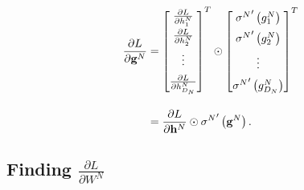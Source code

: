 \documentclass{article}
\newcommand{\pd}[0]{\phantom{.}}
\begin{document}
\begin{align}
    \label{eq:dL/dgN}
    \pd\frac{\partial L}{\partial \mathbf{g}^N} &=
    \begin{bmatrix}
        \frac{\partial L}{\partial h^N_1} \\[0.5em]
        \frac{\partial L}{\partial h^N_2} \\[0.5em]
        \vdots \\[0.5em]
        \frac{\partial L}{\partial h^N_{D_N}}
    \end{bmatrix}^T
    \odot
    \begin{bmatrix}
        {\sigma^{N}}^{\prime}\left(g^N_1\right) \\[0.5em]
        {\sigma^{N}}^{\prime}\left(g^N_2\right) \\[0.5em]
        \vdots \\[0.5em]
        {\sigma^{N}}^{\prime}\left(g^N_{D_N}\right)
    \end{bmatrix}^T\notag \\[1em]
    &= \frac{\partial L}{\partial \mathbf{h}^N}\odot{\sigma^N}^{\prime}\left(\mathbf{g}^N\right).
\end{align}

\subsection{Finding \texorpdfstring{$\frac{\partial L}{\partial W^N}$}{dL/dWN}}
\label{sec:dL/dWN}
\end{document}
